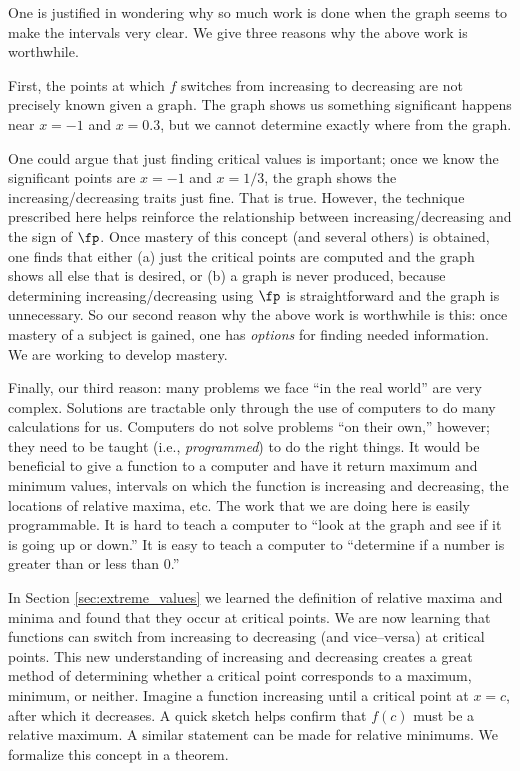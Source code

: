 \enlargethispage{2\baselineskip}
One is justified in wondering why so much work is done when the graph seems to make the intervals very clear. We give three reasons why the above work is worthwhile.

First, the points at which $f$ switches from increasing to decreasing are not precisely known given a graph. The graph shows us something significant happens near $x=-1$ and $x=0.3$, but we cannot determine exactly where from the graph. 

One could argue that just finding critical values is important; once we know the significant points are $x=-1$ and $x=1/3$, the graph shows the increasing/decreasing traits just fine. That is true. However, the technique prescribed here helps reinforce the relationship between increasing/decreasing and the sign of $\fp$. Once mastery of this concept (and several others) is obtained, one finds that either (a) just the critical points are computed and the graph shows all else that is desired, or (b) a graph is never produced, because determining increasing/decreasing using $\fp$ is straightforward and the graph is unnecessary. 
So our second reason why the above work is worthwhile is this: once mastery of a subject is gained, one has \textit{options} for finding needed information. We are working to develop mastery.

Finally, our third reason: many problems we face ``in the real world'' are very complex. Solutions are tractable only through the use of computers to do many calculations for us. Computers do not solve problems ``on their own,'' however; they need to be taught (i.e., \textit{programmed}) to do the right things. It would be beneficial to give a function to a computer and have it return maximum and minimum values, intervals on which the function is increasing and decreasing, the locations of relative maxima, etc. The work that we are doing here is easily programmable. It is hard to teach a computer to ``look at the graph and see if it is going up or down.'' It is easy to teach a computer to ``determine if a number is greater than or less than 0.''

\enlargethispage{3\baselineskip}
In Section \ref{sec:extreme_values} we learned the definition of relative maxima and minima and found that they occur at critical points. We are now learning that functions can switch from increasing to decreasing (and vice--versa) at critical points. This new understanding of increasing and decreasing creates a great method of determining whether a critical point corresponds to a maximum, minimum, or neither. Imagine a function increasing until a critical point at $x=c$, after which it decreases. A quick sketch helps confirm that $f(c)$ must be a relative maximum. A similar statement can be made for relative minimums. We formalize this concept in a theorem.

